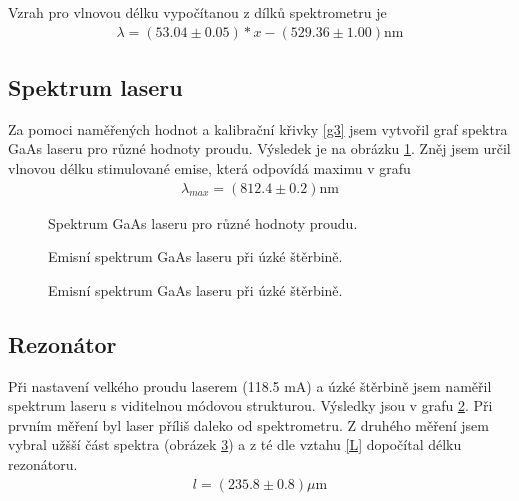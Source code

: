 \documentclass[a4paper,12pt]{article}
\begin{document}
Vzrah pro vlnovou délku vypočítanou z dílků spektrometru je
\begin{eqnarray}
\lambda=(53.04\pm 0.05)*x-(529.36\pm 1.00) \mbox{nm}
\end{eqnarray}


\subsection{Spektrum laseru}
Za pomoci naměřených hodnot a kalibrační křivky \ref{g3} jsem vytvořil graf spektra GaAs laseru pro různé hodnoty proudu. Výsledek je na obrázku \ref{g4}. Zněj jsem určil vlnovou délku stimulované emise, která odpovídá maximu v grafu
\begin{eqnarray}
\lambda_{max}=(812.4 \pm 0.2) \mbox{nm}
\end{eqnarray}

\begin{figure}
\begin{center}

\end{center}
\caption{Spektrum GaAs laseru pro různé hodnoty proudu.}
\label{g4}
\end{figure}

\begin{figure}
\begin{center}

\end{center}
\caption{Emisní spektrum GaAs laseru při úzké štěrbině.}
\label{g5}
\end{figure}

\begin{figure}
\begin{center}

\end{center}
\caption{Emisní spektrum GaAs laseru při úzké štěrbině.}
\label{g6}
\end{figure}


\subsection{Rezonátor}
Při nastavení velkého proudu laserem (118.5 mA) a úzké štěrbině jsem naměřil spektrum laseru s viditelnou módovou strukturou. Výsledky jsou v grafu \ref{g5}. Při prvním měření byl laser příliš daleko od spektrometru. Z druhého měření jsem vybral užšší část spektra (obrázek \ref{g6}) a z té dle vztahu \ref{L} dopočítal délku rezonátoru.
\begin{eqnarray}
l=(235.8 \pm 0.8) \mu\mbox{m}
\end{eqnarray}
\end{document}
